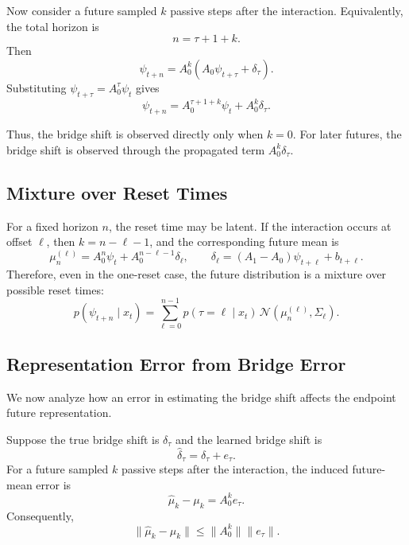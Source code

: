 Now consider a future sampled $k$ passive steps after the interaction. Equivalently, the total horizon is
\[
    n=\tau+1+k.
\]
Then
\begin{equation}
    \psi_{t+n}
    =
    A_0^k
    \left(
    A_0\psi_{t+\tau}
    +
    \delta_{\tau}
    \right).
\end{equation}
Substituting $\psi_{t+\tau}=A_0^\tau\psi_t$ gives
\begin{equation}
    \psi_{t+n}
    =
    A_0^{\tau+1+k}\psi_t
    +
    A_0^k\delta_{\tau}.
    \label{eq:one-reset-future-mean}
\end{equation}

Thus, the bridge shift is observed directly only when $k=0$. For later futures, the bridge shift is observed through the propagated term $A_0^k\delta_{\tau}$.

\subsection{Mixture over Reset Times}

For a fixed horizon $n$, the reset time may be latent. If the interaction occurs at offset $\ell$, then $k=n-\ell-1$, and the corresponding future mean is
\begin{equation}
    \mu_n^{(\ell)}
    =
    A_0^n\psi_t
    +
    A_0^{n-\ell-1}\delta_{\ell},
    \qquad
    \delta_{\ell}
    =
    (A_1-A_0)\psi_{t+\ell}
    +
    b_{t+\ell}.
\end{equation}
Therefore, even in the one-reset case, the future distribution is a mixture over possible reset times:
\begin{equation}
    p(\psi_{t+n}\mid x_t)
    =
    \sum_{\ell=0}^{n-1}
    p(\tau=\ell\mid x_t)
    \,
    \mathcal N
    \left(
    \mu_n^{(\ell)},
    \Sigma_{\ell}
    \right).
    \label{eq:one-reset-mixture}
\end{equation}

\subsection{Representation Error from Bridge Error}

We now analyze how an error in estimating the bridge shift affects the endpoint future representation.

\begin{lemma}
\label{lem:propagated-bridge-error}
Suppose the true bridge shift is $\delta_{\tau}$ and the learned bridge shift is
\begin{equation}
    \widehat{\delta}_{\tau}
    =
    \delta_{\tau}
    +
    e_{\tau}.
\end{equation}
For a future sampled $k$ passive steps after the interaction, the induced future-mean error is
\begin{equation}
    \widehat{\mu}_k-\mu_k
    =
    A_0^k e_{\tau}.
    \label{eq:future-mean-error}
\end{equation}
Consequently,
\begin{equation}
    \|\widehat{\mu}_k-\mu_k\|
    \le
    \|A_0^k\|
    \|e_{\tau}\|.
    \label{eq:future-mean-error-bound}
\end{equation}
\end{lemma}

